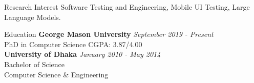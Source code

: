 \documentclass{resume} %
\begin{document}
\begin{rSection}{Research Interest}
Software Testing and Engineering, Mobile UI Testing, Large Language Models.
\end{rSection}

\begin{rSection}{Education}
{\bf George Mason University} \hfill {\em September 2019 - Present} \\
PhD in Computer Science\hfill { CGPA: 3.87/4.00}
\\{\bf University of Dhaka} \hfill {\em January 2010 - May 2014} \\
Bachelor of Science \hfill { }
\\Computer Science \& Engineering
\end{rSection}
\end{document}
